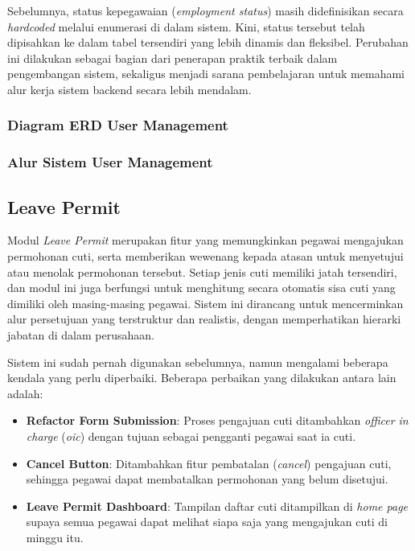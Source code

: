 Sebelumnya, status kepegawaian (\textit{employment status}) masih didefinisikan secara \textit{hardcoded} melalui enumerasi di dalam sistem. Kini, status tersebut telah dipisahkan ke dalam tabel tersendiri yang lebih dinamis dan fleksibel. Perubahan ini dilakukan sebagai bagian dari penerapan praktik terbaik dalam pengembangan sistem, sekaligus menjadi sarana pembelajaran untuk memahami alur kerja sistem backend secara lebih mendalam.

\subsubsection{Diagram ERD User Management}
\subsubsection{Alur Sistem User Management}


\subsection{Leave Permit}
Modul \textit{Leave Permit} merupakan fitur yang memungkinkan pegawai mengajukan permohonan cuti, serta memberikan wewenang kepada atasan untuk menyetujui atau menolak permohonan tersebut. Setiap jenis cuti memiliki jatah tersendiri, dan modul ini juga berfungsi untuk menghitung secara otomatis sisa cuti yang dimiliki oleh masing-masing pegawai. Sistem ini dirancang untuk mencerminkan alur persetujuan yang terstruktur dan realistis, dengan memperhatikan hierarki jabatan di dalam perusahaan.

Sistem ini sudah pernah digunakan sebelumnya, namun mengalami beberapa kendala yang perlu diperbaiki. Beberapa perbaikan yang dilakukan antara lain adalah:
\begin{itemize}
    \item \textbf{Refactor Form Submission}: Proses pengajuan cuti ditambahkan \textit{officer in charge} (\textit{oic}) dengan tujuan sebagai pengganti pegawai saat ia cuti.
    \item \textbf{Cancel Button}: Ditambahkan fitur pembatalan (\textit{cancel}) pengajuan cuti, sehingga pegawai dapat membatalkan permohonan yang belum disetujui.
    \item \textbf{Leave Permit Dashboard}: Tampilan daftar cuti ditampilkan di \textit{home page} supaya semua pegawai dapat melihat siapa saja yang mengajukan cuti di minggu itu.
\end{itemize}


